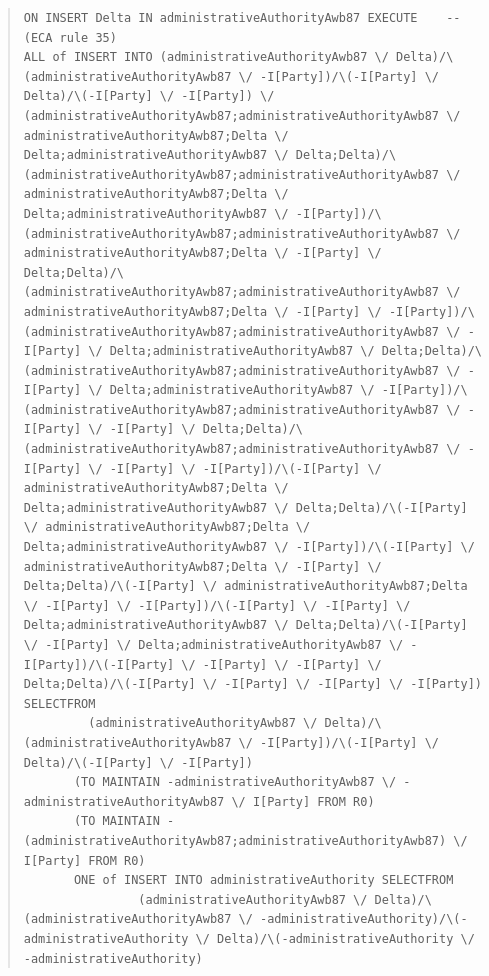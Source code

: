 \documentclass[10pt,a4paper]{report}              %
\theoremstyle{plain}\theorembodyfont{\rmfamily}\newtheorem{definition}{Definition}[section]
\theoremstyle{plain}\theorembodyfont{\rmfamily}\newtheorem{designrule}[definition]{Requirement}
\begin{document}
\begin{quote}
\begin{verbatim}
ON INSERT Delta IN administrativeAuthorityAwb87 EXECUTE    -- (ECA rule 35)
ALL of INSERT INTO (administrativeAuthorityAwb87 \/ Delta)/\(administrativeAuthorityAwb87 \/ -I[Party])/\(-I[Party] \/ Delta)/\(-I[Party] \/ -I[Party]) \/ (administrativeAuthorityAwb87;administrativeAuthorityAwb87 \/ administrativeAuthorityAwb87;Delta \/ Delta;administrativeAuthorityAwb87 \/ Delta;Delta)/\(administrativeAuthorityAwb87;administrativeAuthorityAwb87 \/ administrativeAuthorityAwb87;Delta \/ Delta;administrativeAuthorityAwb87 \/ -I[Party])/\(administrativeAuthorityAwb87;administrativeAuthorityAwb87 \/ administrativeAuthorityAwb87;Delta \/ -I[Party] \/ Delta;Delta)/\(administrativeAuthorityAwb87;administrativeAuthorityAwb87 \/ administrativeAuthorityAwb87;Delta \/ -I[Party] \/ -I[Party])/\(administrativeAuthorityAwb87;administrativeAuthorityAwb87 \/ -I[Party] \/ Delta;administrativeAuthorityAwb87 \/ Delta;Delta)/\(administrativeAuthorityAwb87;administrativeAuthorityAwb87 \/ -I[Party] \/ Delta;administrativeAuthorityAwb87 \/ -I[Party])/\(administrativeAuthorityAwb87;administrativeAuthorityAwb87 \/ -I[Party] \/ -I[Party] \/ Delta;Delta)/\(administrativeAuthorityAwb87;administrativeAuthorityAwb87 \/ -I[Party] \/ -I[Party] \/ -I[Party])/\(-I[Party] \/ administrativeAuthorityAwb87;Delta \/ Delta;administrativeAuthorityAwb87 \/ Delta;Delta)/\(-I[Party] \/ administrativeAuthorityAwb87;Delta \/ Delta;administrativeAuthorityAwb87 \/ -I[Party])/\(-I[Party] \/ administrativeAuthorityAwb87;Delta \/ -I[Party] \/ Delta;Delta)/\(-I[Party] \/ administrativeAuthorityAwb87;Delta \/ -I[Party] \/ -I[Party])/\(-I[Party] \/ -I[Party] \/ Delta;administrativeAuthorityAwb87 \/ Delta;Delta)/\(-I[Party] \/ -I[Party] \/ Delta;administrativeAuthorityAwb87 \/ -I[Party])/\(-I[Party] \/ -I[Party] \/ -I[Party] \/ Delta;Delta)/\(-I[Party] \/ -I[Party] \/ -I[Party] \/ -I[Party]) SELECTFROM
         (administrativeAuthorityAwb87 \/ Delta)/\(administrativeAuthorityAwb87 \/ -I[Party])/\(-I[Party] \/ Delta)/\(-I[Party] \/ -I[Party])
       (TO MAINTAIN -administrativeAuthorityAwb87 \/ -administrativeAuthorityAwb87 \/ I[Party] FROM R0)
       (TO MAINTAIN -(administrativeAuthorityAwb87;administrativeAuthorityAwb87) \/ I[Party] FROM R0)
       ONE of INSERT INTO administrativeAuthority SELECTFROM
                (administrativeAuthorityAwb87 \/ Delta)/\(administrativeAuthorityAwb87 \/ -administrativeAuthority)/\(-administrativeAuthority \/ Delta)/\(-administrativeAuthority \/ -administrativeAuthority)

\end{verbatim}
\end{quote}
\end{document}
